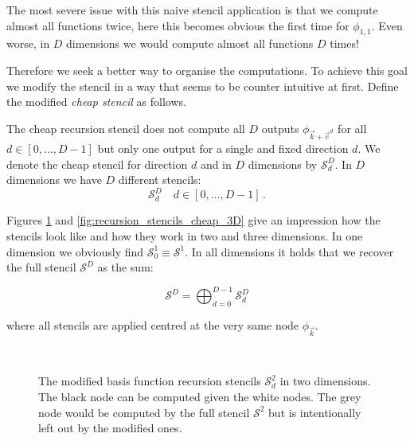 The most severe issue with this naive stencil application is that we compute almost
all functions twice, here this becomes obvious the first time for $\phi_{1,1}$.
Even worse, in $D$ dimensions we would compute almost all functions $D$ times!

Therefore we seek a better way to organise the computations. To achieve this goal we
modify the stencil in a way that seems to be counter intuitive at first. Define the
modified \emph{cheap stencil} as follows.

\begin{definition}
  The cheap recursion stencil does not compute all $D$ outputs $\phi_{\vec{k}+\vec{e}^d}$
  for all $d \in [0, \ldots, D-1]$ but only one output for a single and fixed direction $d$.
  We denote the cheap stencil for direction $d$ and in $D$ dimensions by $\mathcal{S}_d^D$.
  In $D$ dimensions we have $D$ different stencils:
  \begin{equation*}
    \mathcal{S}^D_d \quad d \in [0, \ldots, D-1] \, .
  \end{equation*}
\end{definition}

Figures \ref{fig:recursion_stencils_cheap_2D} and \ref{fig:recursion_stencils_cheap_3D}
give an impression how the stencils look like and how they work in two and three
dimensions. In one dimension we obviously find $\mathcal{S}^1_0 \equiv \mathcal{S}^1$.
In all dimensions it holds that we recover the full stencil $\mathcal{S}^D$ as the sum:

\begin{equation*}
  \mathcal{S}^D = \bigoplus_{d=0}^{D-1} \mathcal{S}^D_d
\end{equation*}

where all stencils are applied centred at the very same node $\phi_{\vec{k}}$.

\begin{figure}[h!]
  \centering
  \subfloat[][$\mathcal{S}^2_0$]{
    
  }
  \subfloat[][$\mathcal{S}^2_1$]{
    
  } \\
    \caption[Cheap recursion stencils in two dimensions]{The modified basis
    function recursion stencils $\mathcal{S}^2_d$ in two dimensions.
    The black node can be computed given the white nodes. The grey node would be
    computed by the full stencil $\mathcal{S}^2$ but is intentionally left out by
    the modified ones.}
    \label{fig:recursion_stencils_cheap_2D}
\end{figure}

